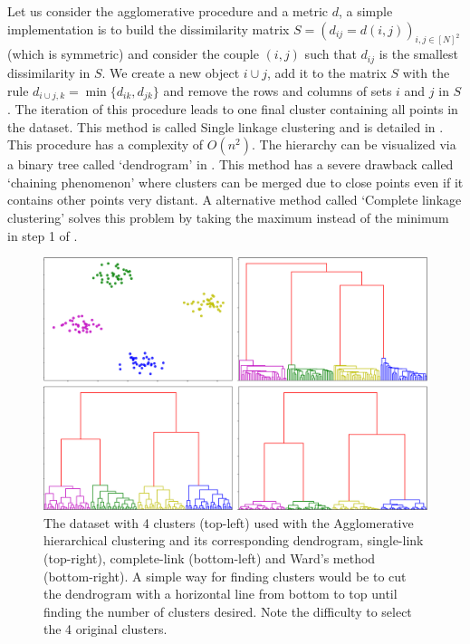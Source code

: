 Let us consider the agglomerative procedure and a metric $d$, a simple implementation is to build the dissimilarity matrix $S=(d_{ij}=d(i,j))_{i,j\in [N]^2}$ (which is symmetric) and consider the couple $(i,j)$ such that $d_{ij}$ is the smallest dissimilarity in $S$. We create a new object $i \cup j$, add it to the matrix $S$ with the rule $d_{i\cup j, k}=\min\{d_{ik},d_{jk}\}$ and remove the rows and columns of sets $i$ and $j$ in $S$. The iteration of this procedure leads to one final cluster containing all points in the dataset. This method is called Single linkage clustering \citep{Graham:1985:HMS:1435654.1436662} and is detailed in . This procedure has a complexity of $O(n^2)$\citep{hierarchicalMurtagh}. The hierarchy can be visualized via a binary tree called `dendrogram' in . This method has a severe drawback called `chaining phenomenon' where clusters can be merged due to close points even if it contains other points very distant. A alternative method called `Complete linkage clustering' solves this problem by taking the maximum instead of the minimum in step 1 of . 
 \begin{figure}[h]
 \center
 \includegraphics[scale=0.35]{TeX_files/dendrogram.png}
 \caption{The dataset with 4 clusters (top-left) used with the Agglomerative hierarchical clustering and its corresponding dendrogram, single-link (top-right), complete-link (bottom-left) and Ward's method (bottom-right). A simple way for finding clusters would be to cut the dendrogram with a horizontal line from bottom to top until finding the number of clusters desired. Note the difficulty to select the 4 original clusters.}
 \label{dendrogram_graph}
 \end{figure}
